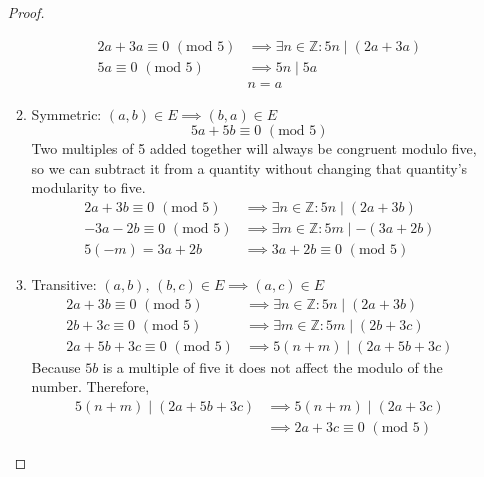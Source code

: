 \documentclass[12pt,a4paper,reqno,parskip=full]{amsart}
\numberwithin{equation}{section}
\theoremstyle{plain}
\theoremstyle{definition}
\begin{document}
\begin{enumerate}
\begin{proof}
\begin{enumerate}[i]
                  \begin{align*}
                    2a + 3a \equiv 0\,\,(\text{mod}\,\,5)
                     & \implies\exists n\in\mathbb{Z}: 5n\mid (2a + 3a) \\
                    5a      \equiv 0\,\,(\text{mod}\,\,5)
                     & \implies 5n\mid 5a                               \\
                     & n  = a
                  \end{align*}
            \item Symmetric: $(a,b)\in E \implies (b, a)\in E$
                  \[5a + 5b \equiv 0\,\,(\text{mod}\,\,5)\]
                  Two multiples of 5 added together will always be congruent modulo five, so we can
                  subtract it from a quantity without changing that quantity's modularity to five.
                  \begin{align*}
                    2a + 3b \equiv 0\,\,(\text{mod}\,\,5)
                                    & \implies\exists n\in\mathbb{Z}: 5n\mid (2a + 3b)  \\
                    -3a - 2b \equiv 0\,\,(\text{mod}\,\,5)
                                    & \implies\exists m\in\mathbb{Z}: 5m\mid -(3a + 2b) \\
                    5(-m) = 3a + 2b & \implies 3a + 2b \equiv 0\,\,(\text{mod}\,\,5)
                  \end{align*}
            \item Transitive: $(a,b),\,(b,c)\in E \implies (a, c)\in E$
                  \begin{align*}
                    2a + 3b \equiv 0\,\,(\text{mod}\,\,5)
                     & \implies\exists n\in\mathbb{Z}: 5n\mid (2a + 3b) \\
                    2b + 3c \equiv 0\,\,(\text{mod}\,\,5)
                     & \implies\exists m\in\mathbb{Z}: 5m\mid (2b + 3c) \\
                    2a + 5b + 3c \equiv 0\,\,(\text{mod}\,\,5)
                     & \implies 5(n + m)\mid (2a + 5b + 3c)
                  \end{align*}
                  Because $5b$ is a multiple of five it does not affect the modulo of the number.
                  Therefore,
                  \begin{align*}
                    5(n + m)\mid (2a + 5b + 3c) & \implies 5(n + m)\mid (2a + 3c)                \\
                                                & \implies 2a + 3c \equiv 0\,\,(\text{mod}\,\,5)
                  \end{align*}
          \end{enumerate}


\end{proof}
\end{enumerate}
\end{document}
